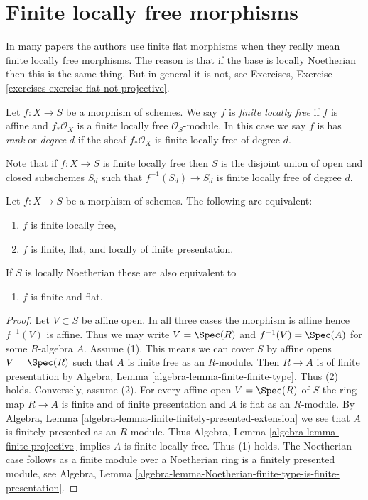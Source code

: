 \section{Finite locally free morphisms}
\label{section-finite-locally-free}

\noindent
In many papers the authors use finite flat morphisms when they really mean
finite locally free morphisms. The reason is that if the base is locally
Noetherian then this is the same thing. But in general it is not, see
Exercises, Exercise \ref{exercises-exercise-flat-not-projective}.

\begin{definition}
\label{definition-finite-locally-free}
Let $f : X \to S$ be a morphism of schemes.
We say $f$ is {\it finite locally free} if $f$ is
affine and $f_*\mathcal{O}_X$ is a finite locally
free $\mathcal{O}_S$-module. In this case we say $f$ is
has {\it rank} or {\it degree} $d$
if the sheaf $f_*\mathcal{O}_X$ is finite locally free of degree $d$.
\end{definition}

\noindent
Note that if $f : X \to S$ is finite locally free then $S$ is the disjoint
union of open and closed subschemes $S_d$ such that $f^{-1}(S_d) \to S_d$
is finite locally free of degree $d$.

\begin{lemma}
\label{lemma-finite-flat}
Let $f : X \to S$ be a morphism of schemes.
The following are equivalent:
\begin{enumerate}
\item $f$ is finite locally free,
\item $f$ is finite, flat, and locally of finite presentation.
\end{enumerate}
If $S$ is locally Noetherian these are also equivalent to
\begin{enumerate}
\item[(3)] $f$ is finite and flat.
\end{enumerate}
\end{lemma}

\begin{proof}
Let $V \subset S$ be affine open. In all three cases
the morphism is affine hence $f^{-1}(V)$ is affine.
Thus we may write $V = \Spec(R)$ and $f^{-1}(V) = \Spec(A)$
for some $R$-algebra $A$.
Assume (1). This means we can cover $S$ by affine opens
$V = \Spec(R)$ such that $A$ is finite free as an $R$-module.
Then $R \to A$ is of finite presentation by
Algebra, Lemma \ref{algebra-lemma-finite-finite-type}.
Thus (2) holds. Conversely, assume (2).
For every affine open $V = \Spec(R)$ of $S$ the ring map
$R \to A$ is finite and of finite presentation and $A$ is flat
as an $R$-module. By
Algebra, Lemma \ref{algebra-lemma-finite-finitely-presented-extension}
we see that $A$ is finitely presented as an $R$-module.
Thus Algebra, Lemma \ref{algebra-lemma-finite-projective}
implies $A$ is finite locally free. Thus (1) holds.
The Noetherian case follows as a finite module over a Noetherian ring
is a finitely presented module, see Algebra,
Lemma \ref{algebra-lemma-Noetherian-finite-type-is-finite-presentation}.
\end{proof}

